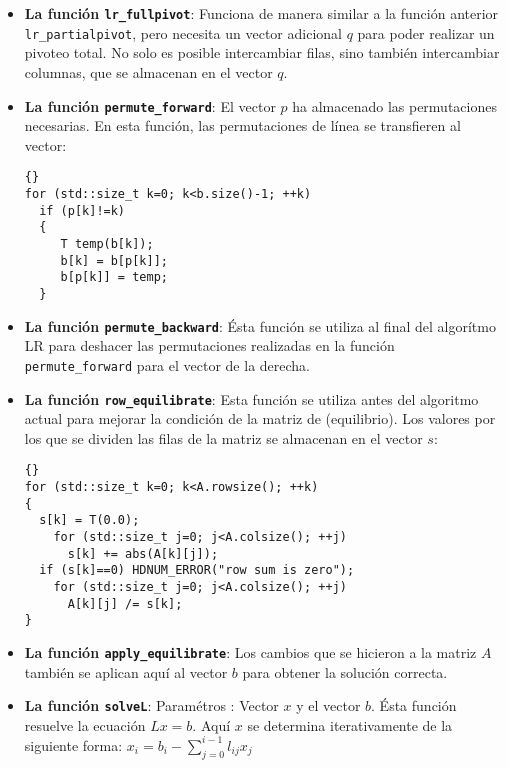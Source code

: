 \begin{itemize}
\item  \textbf{La función \lstinline{lr_fullpivot}}: Funciona de manera similar a la función 
  anterior \lstinline{lr_partialpivot}, pero necesita un vector adicional $q$ para poder realizar un pivoteo total. 
  No solo es posible intercambiar filas, sino también intercambiar columnas, 
  que se almacenan en el vector $q$.

\item \textbf{La función \lstinline{permute_forward}}: 
  El vector $p$ ha almacenado las permutaciones necesarias. En esta función, las permutaciones 
  de línea se transfieren al vector:

{\footnotesize{\begin{lstlisting}{}
for (std::size_t k=0; k<b.size()-1; ++k)
  if (p[k]!=k)
  {
     T temp(b[k]);
     b[k] = b[p[k]];
     b[p[k]] = temp;
  }
\end{lstlisting}}}

\item \textbf{La función \lstinline{permute_backward}}: 
  Ésta función se utiliza al final del algorítmo LR para deshacer las permutaciones 
  realizadas en la función \lstinline{permute_forward} para el vector de la derecha.

\item \textbf{La función \lstinline{row_equilibrate}}: 
  Esta función se utiliza antes del algoritmo actual para mejorar la condición de la matriz de 
  (equilibrio). Los valores por los que se dividen las filas de la matriz se almacenan en el vector $s$:

{\footnotesize{\begin{lstlisting}{}
for (std::size_t k=0; k<A.rowsize(); ++k)
{
  s[k] = T(0.0);
    for (std::size_t j=0; j<A.colsize(); ++j)
      s[k] += abs(A[k][j]);
  if (s[k]==0) HDNUM_ERROR("row sum is zero");
    for (std::size_t j=0; j<A.colsize(); ++j)
      A[k][j] /= s[k];
}
\end{lstlisting}}}


\item \textbf{La función \lstinline{apply_equilibrate}}: 
  Los cambios que se hicieron a la matriz $A$ también se aplican aquí al vector $b$ 
  para obtener la solución correcta.

\item \textbf{La función \lstinline{solveL}}: Paramétros : Vector $x$
  y el vector  $b$.  Ésta función resuelve la ecuación $Lx=b$. Aquí $x$ se 
  determina iterativamente de la siguiente forma:
  $x_i= b_i - \sum_{j=0}^{i-1} l_{ij}x_j$


\end{itemize}
